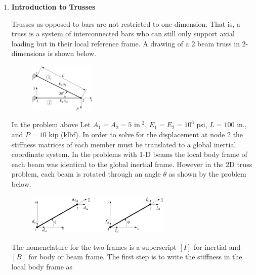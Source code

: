 \begin{enumerate}
    \item {\bf Introduction to Trusses} \label{s:trusses}

      Trusses as opposed to bars are not restricted to one
      dimension. That is, a truss is a system of interconnected bars
      who can still only support axial loading but in their local
      reference frame. A drawing of a 2 beam truss in 2-dimensions is
      shown below.  

      \begin{figure}[H]
        \begin{center}
          \includegraphics[height=0.2\textwidth,width=0.3\textwidth]{Graphics/L06_F5.pdf}
        \end{center}
      \end{figure}

      In the problem above Let $A_1=A_2=5$ in.$^2$, $E_1=E_2=10^6$
      psi, $L=100$ in., and $P=10$ kip (klbf). In order to solve for the displacement at node 2 the stiffness
      matrices of each member must be translated to a global inertial
      coordinate system. In the problems with 1-D beams the local body
      frame of each beam was identical to the global inertial
      frame. However in the 2D truss problem, each beam is rotated
      through an angle $\theta$ as shown by the problem below.

      \begin{figure}[H]
        \begin{center}
          \includegraphics[height=0.2\textwidth,width=0.65\textwidth]{Graphics/L06_F4.pdf}
        \end{center}
      \end{figure}

      The nomenclature for the two
      frames is a superscript $[I]$ for 
      inertial and $[B]$ for body or beam frame. The first step is to
      write the stiffness in the local body frame as


\end{enumerate}
